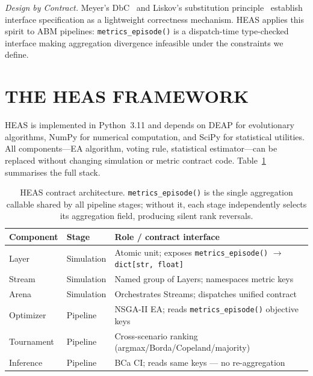 \documentclass{wscpaperproc}
\begin{document}
\textit{Design by Contract.}
Meyer's DbC~\cite{meyer1997object} and Liskov's substitution
principle~\cite{liskov1994behavioral} establish interface specification as a
lightweight correctness mechanism. HEAS applies this spirit to ABM pipelines:
\texttt{metrics\_episode()} is a dispatch-time type-checked interface making
aggregation divergence infeasible under the constraints we define.

\section{THE HEAS FRAMEWORK}

HEAS is implemented in Python~3.11 and depends on DEAP for evolutionary
algorithms, NumPy for numerical computation, and SciPy for statistical
utilities. All components---EA algorithm, voting rule, statistical
estimator---can be replaced without changing simulation or metric contract code.
Table~\ref{tab:architecture} summarises the full stack.

\begin{table}[t]
\centering\footnotesize
\caption{HEAS contract architecture. \texttt{metrics\_episode()} is the single
  aggregation callable shared by all pipeline stages; without it, each stage
  independently selects its aggregation field, producing silent rank reversals.}
\label{tab:architecture}
\setlength{\tabcolsep}{5pt}
\begin{tabular}{@{}llp{5.8cm}@{}}
\toprule
\textbf{Component} & \textbf{Stage} & \textbf{Role / contract interface} \\
\midrule
Layer   & Simulation & Atomic unit; exposes \texttt{metrics\_episode()} $\!\to\!$ \texttt{dict[str,\,float]} \\
Stream  & Simulation & Named group of Layers; namespaces metric keys \\
Arena   & Simulation & Orchestrates Streams; dispatches unified contract \\
\midrule
Optimizer   & Pipeline & NSGA-II EA; reads \texttt{metrics\_episode()} objective keys \\
Tournament  & Pipeline & Cross-scenario ranking (argmax/Borda/Copeland/majority) \\
Inference   & Pipeline & BCa CI; reads same keys --- no re-aggregation \\
\bottomrule
\end{tabular}
\end{table}
\end{document}
